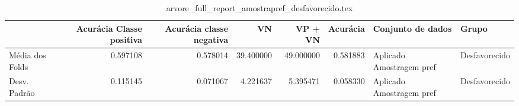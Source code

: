 \begin{table}
\centering
\caption{arvore_full_report_amostrapref_desfavorecido.tex}
\label{arvore_full_report_amostrapref_desfavorecido.tex}
\begin{tabular}{lrrrrrll}
\toprule
{}              &  Acurácia Classe positiva &  Acurácia classe negativa &        VN  &   VP + VN  &  Acurácia &         Conjunto de dados &          Grupo \\
\midrule
Média dos Folds &                  0.597108 &                  0.578014 &  39.400000 &  49.000000 &  0.581883 &  Aplicado Amostragem pref &  Desfavorecido \\
Desv. Padrão    &                  0.115145 &                  0.071067 &   4.221637 &   5.395471 &  0.058330 &  Aplicado Amostragem pref &  Desfavorecido \\
\bottomrule
\end{tabular}
\end{table}
